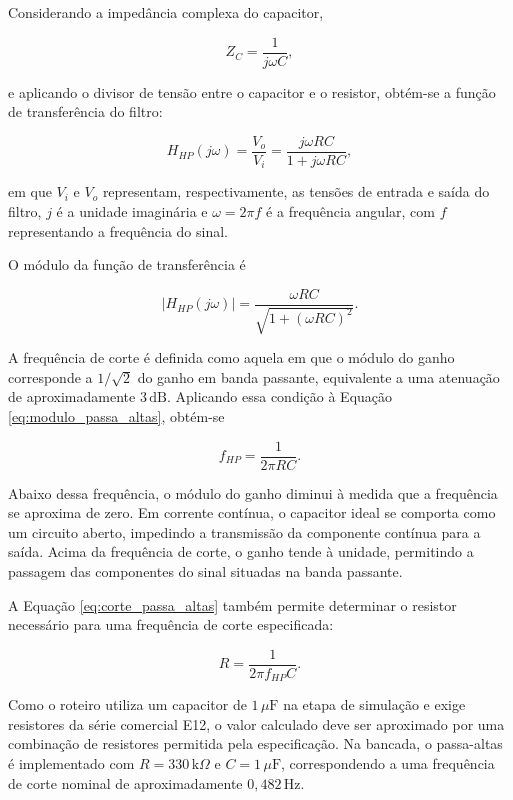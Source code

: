 \documentclass[11pt,a4paper]{article}
\begin{document}
Considerando a impedância complexa do capacitor,

\begin{equation}
Z_C=\frac{1}{j\omega C},
\label{eq:impedancia_capacitor}
\end{equation}

e aplicando o divisor de tensão entre o capacitor e o resistor, obtém-se a função de transferência do filtro:

\begin{equation}
H_{HP}(j\omega)
=
\frac{V_o}{V_i}
=
\frac{j\omega RC}{1+j\omega RC},
\label{eq:funcao_passa_altas}
\end{equation}

em que $V_i$ e $V_o$ representam, respectivamente, as tensões de entrada e saída do filtro, $j$ é a unidade imaginária e $\omega=2\pi f$ é a frequência angular, com $f$ representando a frequência do sinal.

O módulo da função de transferência é

\begin{equation}
\left|H_{HP}(j\omega)\right|
=
\frac{\omega RC}{\sqrt{1+(\omega RC)^2}}.
\label{eq:modulo_passa_altas}
\end{equation}

A frequência de corte é definida como aquela em que o módulo do ganho corresponde a $1/\sqrt{2}$ do ganho em banda passante, equivalente a uma atenuação de aproximadamente $3\,\mathrm{dB}$. Aplicando essa condição à Equação \ref{eq:modulo_passa_altas}, obtém-se

\begin{equation}
f_{HP}=\frac{1}{2\pi RC}.
\label{eq:corte_passa_altas}
\end{equation}

Abaixo dessa frequência, o módulo do ganho diminui à medida que a frequência se aproxima de zero. Em corrente contínua, o capacitor ideal se comporta como um circuito aberto, impedindo a transmissão da componente contínua para a saída. Acima da frequência de corte, o ganho tende à unidade, permitindo a passagem das componentes do sinal situadas na banda passante.

A Equação \ref{eq:corte_passa_altas} também permite determinar o resistor necessário para uma frequência de corte especificada:

\begin{equation}
R=\frac{1}{2\pi f_{HP}C}.
\label{eq:resistor_passa_altas}
\end{equation}

Como o roteiro utiliza um capacitor de $1\,\mu\mathrm{F}$ na etapa de simulação e exige resistores da série comercial E12, o valor calculado deve ser aproximado por uma combinação de resistores permitida pela especificação. Na bancada, o passa-altas é implementado com $R=330\,\mathrm{k}\Omega$ e $C=1\,\mu\mathrm{F}$, correspondendo a uma frequência de corte nominal de aproximadamente $0{,}482\,\mathrm{Hz}$.
\end{document}
